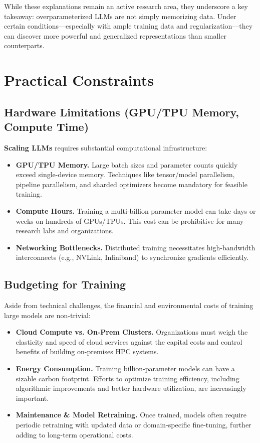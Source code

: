 \noindent
While these explanations remain an active research area, they underscore a key takeaway: overparameterized LLMs are not simply memorizing data. Under certain conditions—especially with ample training data and regularization—they can discover more powerful and generalized representations than smaller counterparts.

\section{Practical Constraints}
\label{sec:practical_constraints}

\subsection{Hardware Limitations (GPU/TPU Memory, Compute Time)}
\noindent
\textbf{Scaling LLMs} requires substantial computational infrastructure:
\begin{itemize}
    \item \textbf{GPU/TPU Memory.} Large batch sizes and parameter counts quickly exceed single-device memory. Techniques like tensor/model parallelism, pipeline parallelism, and sharded optimizers become mandatory for feasible training.
    \item \textbf{Compute Hours.} Training a multi-billion parameter model can take days or weeks on hundreds of GPUs/TPUs. This cost can be prohibitive for many research labs and organizations.
    \item \textbf{Networking Bottlenecks.} Distributed training necessitates high-bandwidth interconnects (e.g., NVLink, Infiniband) to synchronize gradients efficiently.
\end{itemize}

\subsection{Budgeting for Training}
\noindent
Aside from technical challenges, the financial and environmental costs of training large models are non-trivial:
\begin{itemize}
    \item \textbf{Cloud Compute vs. On-Prem Clusters.} Organizations must weigh the elasticity and speed of cloud services against the capital costs and control benefits of building on-premises HPC systems.
    \item \textbf{Energy Consumption.} Training billion-parameter models can have a sizable carbon footprint. Efforts to optimize training efficiency, including algorithmic improvements and better hardware utilization, are increasingly important.
    \item \textbf{Maintenance \& Model Retraining.} Once trained, models often require periodic retraining with updated data or domain-specific fine-tuning, further adding to long-term operational costs.
\end{itemize}

